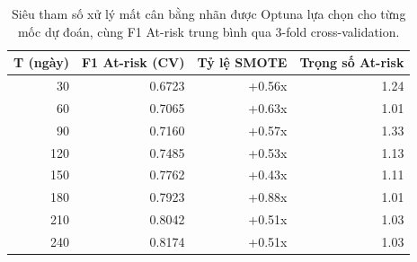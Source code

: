 \begin{table}[H]
  \centering
  \caption{Siêu tham số xử lý mất cân bằng nhãn được Optuna lựa chọn cho từng mốc dự đoán, cùng F1 At-risk trung bình qua 3-fold cross-validation.}
  \label{tab:snapshot_params}
  \begin{tabular}{rrrr}
    \toprule
    \textbf{T (ngày)} & \textbf{F1 At-risk (CV)} & \textbf{Tỷ lệ SMOTE} & \textbf{Trọng số At-risk} \\
    \midrule
    30 & 0.6723 & +0.56x & 1.24 \\
    60 & 0.7065 & +0.63x & 1.01 \\
    90 & 0.7160 & +0.57x & 1.33 \\
    120 & 0.7485 & +0.53x & 1.13 \\
    150 & 0.7762 & +0.43x & 1.11 \\
    180 & 0.7923 & +0.88x & 1.01 \\
    210 & 0.8042 & +0.51x & 1.03 \\
    240 & 0.8174 & +0.51x & 1.03 \\
    \bottomrule
  \end{tabular}
\end{table}
